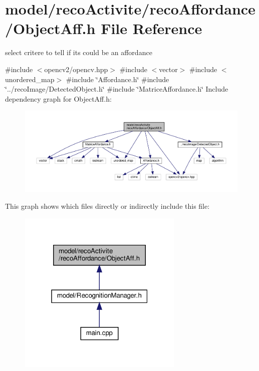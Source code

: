 \section{model/reco\+Activite/reco\+Affordance/\+Object\+Aff.h File Reference}
\label{_object_aff_8h}


select critere to tell if it\textquotesingle{}s could be an affordance  


{\ttfamily \#include $<$opencv2/opencv.\+hpp$>$}\newline
{\ttfamily \#include $<$vector$>$}\newline
{\ttfamily \#include $<$unordered\+\_\+map$>$}\newline
{\ttfamily \#include \char`\"{}Affordance.\+h\char`\"{}}\newline
{\ttfamily \#include \char`\"{}../reco\+Image/\+Detected\+Object.\+h\char`\"{}}\newline
{\ttfamily \#include \char`\"{}Matrice\+Affordance.\+h\char`\"{}}\newline
Include dependency graph for Object\+Aff.\+h\+:
\nopagebreak
\begin{figure}[H]
\begin{center}
\leavevmode
\includegraphics[width=350pt]{_object_aff_8h__incl}
\end{center}
\end{figure}
This graph shows which files directly or indirectly include this file\+:
\nopagebreak
\begin{figure}[H]
\begin{center}
\leavevmode
\includegraphics[width=223pt]{_object_aff_8h__dep__incl}
\end{center}
\end{figure}
